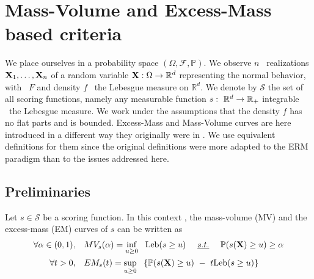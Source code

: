 \section{Mass-Volume and Excess-Mass based criteria}
\label{evaluation:background}
We place ourselves in a probability space $(\Omega, \mathcal{F}, \mathbb{P})$. We observe $n$ \iid~realizations $\mathbf X_1,\ldots,\mathbf X_n$ of a random variable $\mathbf X:\Omega \to \mathbb{R}^d$ representing the normal behavior, with \cdf~$F$ and density $f$ \wrt~the Lebesgue measure on $\mathbb{R}^d$. We denote by $\mathcal{S}$ the set of all scoring functions, namely any measurable function $s:~\mathbb{R}^d \to \mathbb{R}_+$ integrable \wrt~the Lebesgue measure.
We work under the assumptions that the density $f$ %
has no flat parts and is bounded. Excess-Mass and Mass-Volume curves are here introduced in a different way they originally were in \cite{CLEM13, AISTAT15}. We use equivalent definitions for them since %
the original definitions were more adapted to the ERM paradigm than to the issues addressed here.

\subsection{Preliminaries}
Let $s\in \mathcal{S}$ be a scoring function. In this context \citep{CLEM13,AISTAT15}, the mass-volume (MV) and the excess-mass (EM) curves of $s$ can be written as
\begin{align}
\label{evaluation:MV-def}
\forall \alpha\in (0,1),~~~& MV_s(\alpha) = \inf_{u \ge 0}~~ \text{Leb}(s \ge u) ~~~~\emph{s.t.}{}~~~~ \mathbb{P}(s(\mathbf X) \ge u) \ge \alpha\\
\label{evaluation:EM-def}
\forall t >0,~~~ & EM_s(t) = \sup_{u \ge 0}~~\left\{ \mathbb{P}(s(\mathbf X) \ge u) ~-~ t \text{Leb}(s \ge u) \right\}
\end{align}


